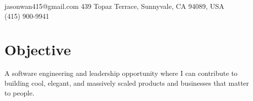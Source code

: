 \documentclass[margin,line]{res}
\newcommand{\sstyle}{\sc}
\begin{document}
\begin{resume}
  {\small
  \vspace*{-.1in}
  \hspace*{-1.3in}jasonwan415@gmail.com \hfill 439 Topaz Terrace, Sunnyvale, CA 94089, USA\\
  \hspace*{-1.3in}\hfill (415) 900-9941}

  \vspace*{-.1in}
  \section{\sstyle Objective}
  A software engineering and leadership opportunity where I can contribute to
  building cool, elegant, and massively scaled products and businesses that
  matter to people.


\end{resume}
\end{document}
